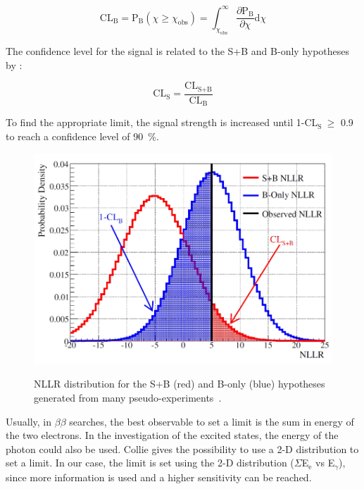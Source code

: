 \documentclass[main.tex]{subfiles}
\begin{document}
\begin{equation}
\text{CL}_{\text{B}} = \text{P}_{\text{B}} (\chi \geq \chi_{\text{obs}} ) = \int_{\chi_{\text{obs}}}^{\infty} \frac{\partial \text{P}_{\text{B}} }{\partial \chi} \text{d}\chi 
\end{equation}


\bigskip


\NI The confidence level for the signal is related to the S+B and B-only hypotheses by : 


\begin{equation}
\text{CL}_{\text{S}} = \frac{\text{CL}_{\text{S+B}} }{\text{CL}_{\text{B}} } 
\end{equation}


\bigskip


\NI To find the appropriate limit, the signal strength is increased until 1-CL$_\text{S}~\geq$ 0.9 to reach a confidence level of 90~\%. 


\begin{figure}[h!]
\centering
\includegraphics[scale=0.35]{pictures/Chap6/NLLR.png}
\label{NLLR}
\caption{NLLR distribution for the S+B (red) and B-only (blue) hypotheses generated from many pseudo-experiments~\cite{NLLR}.}
\end{figure}


\bigskip


\NI Usually, in $\beta\beta$ searches, the best observable to set a limit is the sum in energy of the two electrons. In the investigation of the excited states, the energy of the photon could also be used. Collie gives the possibility to use a 2-D distribution to set a limit. In our case, the limit is set using the 2-D distribution ($\Sigma$E$_\text{e}$ vs E$_{\gamma}$), since more information is used and a higher sensitivity can be reached.   
\end{document}
